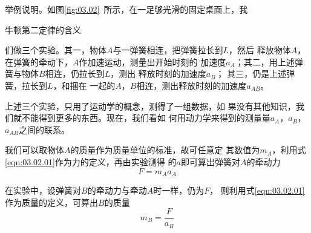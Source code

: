 举例说明。如图\ref{fig:03.02}~所示，在一足够光滑的固定桌面上，我
\begin{figurex}[!h]
    \centering
    \hfill
    \hfill
    \hfill
    \hfill
    \caption{牛顿第二定律的含义}
    \label{fig:03.02}
\end{figurex}
\clearpage
\noindent 们做三个实验。其一，物体$ A $与一弹簧相连，把弹簧拉长到$ L $，然后
释放物体$ A $，在弹簧的牵动下，$ A $作加速运动，测量出开始时刻的
加速度$ a_A $；其二，用上述弹簧与物体$ B $相连，仍拉长到$ L $，测出
释放时刻的加速度$  a _ { B  } $；  其三，仍是上述弹簧，拉长到$ L $，和捆在
一起的$ A $，$ B $相连，测出释放时刻的加速度$  a _ { A B }  $。

上述三个实验，只用了运动学的概念，测得了一组数据，如
果没有其他知识，我们就不能得到更多的东西。现在，我们看如
何用动力学来得到的测量量$ a_A $，$ a_B $，$ a_{AB} $之间的联系。

我们可以取物体$ A $的质量作为质量单位的标准，故可任意定
其数值为$ m_A $，利用式\eqref{eqn:03.02.01}作为力的定义，再由实验测得
的$ a $即可算出弹簧对$ A $的牵动力
\begin{equation}\label{eqn:03.02.02}
    F = m _ { A } a _ { A }
\end{equation}

在实验中，设弹簧对$ B $的牵动力与牵动$ A $时一样，仍为$ F $，
则利用式\eqref{eqn:03.02.01}作为质量的定义，可算出$ B $的质量
\begin{equation}\label{eqn:03.02.03}
    m _ { B } = \frac { F } { a _ { B } }
\end{equation}

